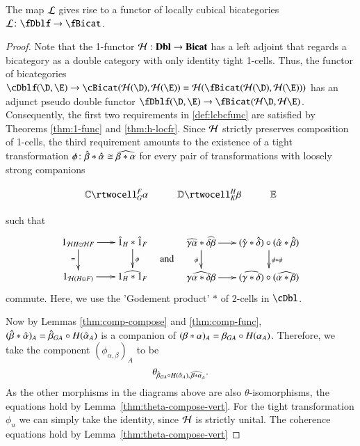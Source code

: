{\begin{thm}\label{thm:h-functor}
The map $\mathcal{L}$ gives rise to a functor of locally cubical bicategories $\cL \maps \fDblf\to \fBicat$.
\end{thm}
\begin{proof}
Note that the 1-functor $\mathcal{H}:\mathbf{Dbl}\to\mathbf{Bicat}$ has a left adjoint that regards a bicategory as a double category with only identity tight 1-cells.
Thus, the functor of bicategories $\cDblf(\D,\E) \rightarrow \cBicat(\cH(\D), \cH (\E)) = \cH( \fBicat(\cH(\D),\cH(\E)))$ has an adjunct pseudo double functor $\fDblf(\D,\E) \rightarrow \fBicat(\cH\D, \cH \E)$. Consequently, the first two requirements in \autoref{def:lcbcfunc} are satisfied by Theorems \ref{thm:1-func} and \ref{thm:h-locfr}.
Since $\mathcal{H}$ strictly preserves composition of 1-cells,
the third requirement amounts to the existence of a tight transformation $\phi\colon \hat{\beta} * \hat{\alpha} \cong \widehat{\beta*\alpha}$ for every pair of transformations with loosely strong companions 

  \[\vcenter{\xymatrix{\lC \rtwocell^F_G{\al} & \lD \rtwocell^H_K{\be}
      & \lE}}\]
      
      such that 
%
 \begin{equation}
        \vcenter{\xymatrix@-.5pc{
        1_{{\cH}H \odot {\cH}F} \ar[r]\ar[d]_{=} &
        \hat{1}_{H}* \hat{1}_{F}\ar[d]^{\phi}\\
        1_{{\cH}(H \odot F)}\ar[r] &
        \widehat{1_{H} * 1_{F}}}} \quad\text{and}\quad       
    \vcenter{\xymatrix@-.5pc{
        \widehat{\gm\al}* \widehat{\de\be} \ar[r]\ar[d]_\phi &
        (\gmhat* \dehat)\circ(\alhat* \behat)\ar[d]^{\phi * \phi}\\
        \widehat{\gm\al* \de\be}\ar[r] &
        (\widehat{\gm* \de})\circ(\widehat{\al* \be})}}
  \end{equation}
commute. 
Here, we use the 'Godement product' $*$ of 2-cells in $\cDbl$.  

  Now by Lemmas \ref{thm:comp-compose} and
  \ref{thm:comp-func}, $(\hat{\beta} *\hat{\alpha})_A = \hat{\beta}_{GA} \circ
  H(\hat{\alpha}_A)$ is a companion of $(\beta*\alpha)_A = \beta_{GA} \circ
  H(\alpha_A)$.  Therefore, we take the component $(\phi_{\alpha,\beta})_A$ to be
  \[\theta_{\hat{\beta}_{GA} \circ H(\hat{\alpha}_A),\, \widehat{\beta*\alpha}_A}.\]
 As the other morphisms in the diagrams above are also $\theta$-isomorphisms, the equations hold by Lemma~\ref{thm:theta-compose-vert}.
For the tight transformation  $\phi_u$ we can simply take the identity, since $\mathcal{H}$ is strictly unital.
The coherence equations hold by Lemma~\ref{thm:theta-compose-vert}
\end{proof}


}
